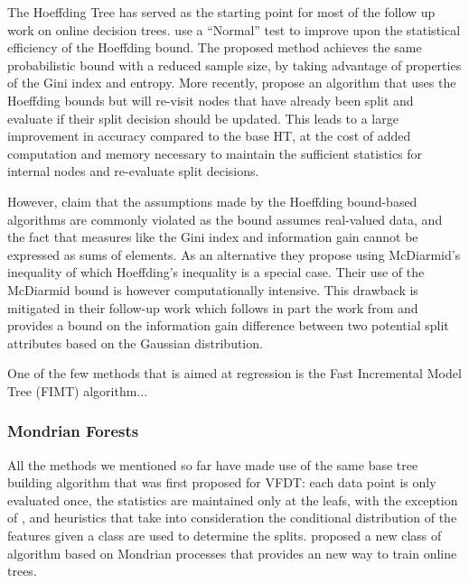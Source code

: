 The Hoeffding Tree has served as the starting point for most of the follow up work on
online decision trees. \citet{vfdt-normal} use a ``Normal'' test to improve
upon the statistical efficiency of the Hoeffding bound. The proposed method achieves
the same probabilistic bound with a reduced sample size, by taking
advantage of properties of the Gini index and entropy. More recently,
\citet{efdt} propose an algorithm that uses the Hoeffding bounds but
will re-visit nodes that have already been split and evaluate if their
split decision should be updated. This leads to a large improvement in accuracy
compared to the base HT,
at the cost of added computation and memory necessary to maintain
the sufficient statistics for internal nodes and re-evaluate split
decisions.


However, \citet{vfdt-mcdiarmid} claim that the assumptions made
by the Hoeffding bound-based algorithms are commonly violated as the bound assumes
real-valued data, and the fact that measures like the Gini index and information
gain cannot be expressed as sums of elements. As an alternative they propose
using McDiarmid's inequality of which Hoeffding's inequality is a special case.
Their use of the McDiarmid
bound is however computationally intensive. This drawback is mitigated
in their follow-up work \cite{vfdt-gaussian} which follows in part the work from \citet{vfdt-normal}
and provides a bound on the information gain difference between two potential
split attributes based on the Gaussian distribution.

One of the few methods that is aimed at regression is the Fast Incremental Model
Tree (FIMT) algorithm...

\subsubsection*{Mondrian Forests}

All the methods we mentioned so far have made use of the same base tree building
algorithm that was first proposed for VFDT: each data point is only evaluated once,
the statistics are maintained only at the leafs, with the exception of \cite{efdt},
and heuristics that take into consideration the conditional distribution of the
features given a class are used to determine the splits. \citet{mondrian-forests-original}
proposed a new class of algorithm based on Mondrian processes \cite{mondrian-process}
that provides an new way to train online trees.

